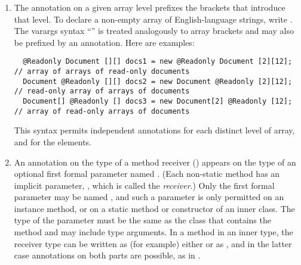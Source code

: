 \documentclass[10pt]{article}
\begin{document}
\begin{enumerate}
% 

\item
  The annotation on a given array level
  prefixes the brackets that introduce that level.  To declare
  a non-empty array of English-language strings, write .
  The varargs syntax ``'' is treated analogously to array brackets
  and may also be prefixed by an annotation.
%
  Here are examples:
\preverbnegspace
\begin{Verbatim}
  @Readonly Document [][] docs1 = new @Readonly Document [2][12]; // array of arrays of read-only documents
  Document @Readonly [][] docs2 = new Document @Readonly [2][12]; // read-only array of arrays of documents
  Document[] @Readonly [] docs3 = new Document[2] @Readonly [12]; // array of read-only arrays of documents
\end{Verbatim}

\preverbnegspace
This syntax permits independent annotations for each distinct level of
array, and for the elements.

\item
  \label{type-annotation-locations-receiver}
  An annotation on the type of a method receiver () appears
  on the type of an optional first formal parameter named .
  (Each non-static method has an implicit parameter, , which is
  called the \emph{receiver}.)  Only the first formal parameter may be
  named , and such a parameter is only permitted on an instance
  method, or on a static method or constructor of an inner class.  The type
  of the  parameter must be the same as the class that contains
  the method and may include type arguments.  In a method in an inner type,
  the receiver type can be
  written as (for example) either  or as ,
  and in the latter case annotations on both parts are possible, as in
  .


\end{enumerate}
\end{document}
